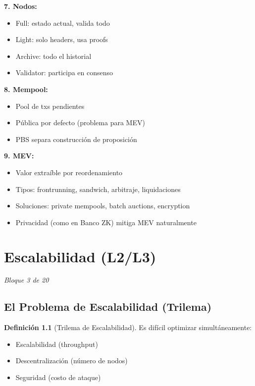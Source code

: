 \documentclass[11pt,a4paper,twoside,openright]{book}
\theoremstyle{definition}
\newtheorem{definition}{Definición}[chapter]
\theoremstyle{plain}
\theoremstyle{remark}
\begin{document}
\begin{keyidea}
\textbf{7. Nodos:}
\begin{itemize}
    \item Full: estado actual, valida todo
    \item Light: solo headers, usa proofs
    \item Archive: todo el historial
    \item Validator: participa en consenso
\end{itemize}

\textbf{8. Mempool:}
\begin{itemize}
    \item Pool de txs pendientes
    \item Pública por defecto (problema para MEV)
    \item PBS separa construcción de proposición
\end{itemize}

\textbf{9. MEV:}
\begin{itemize}
    \item Valor extraíble por reordenamiento
    \item Tipos: frontrunning, sandwich, arbitraje, liquidaciones
    \item Soluciones: private mempools, batch auctions, encryption
    \item Privacidad (como en Banco ZK) mitiga MEV naturalmente
\end{itemize}
\end{keyidea}

\cleardoublepage

\chapter{Escalabilidad (L2/L3)}
\label{ch:bloque3}

\begin{center}
\textit{Bloque 3 de 20}
\end{center}

\section{El Problema de Escalabilidad (Trilema)}

\begin{definition}[Trilema de Escalabilidad]
Es difícil optimizar simultáneamente:
\begin{itemize}
    \item Escalabilidad (throughput)
    \item Descentralización (número de nodos)
    \item Seguridad (costo de ataque)
\end{itemize}
\end{definition}
\end{document}
